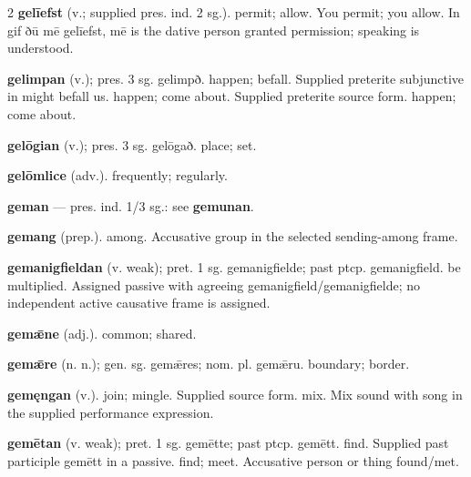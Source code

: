 \begin{multicols*}{2}
\textbf{gelīefst} (v.; supplied pres. ind. 2 sg.). permit; allow. You permit; you allow. In gif ðū mē gelīefst, mē is the dative person granted permission; speaking is understood.\par
\textbf{gelimpan} (v.); pres. 3 sg. gelimpð. happen; befall. Supplied preterite subjunctive in might befall us. happen; come about. Supplied preterite source form. happen; come about.\par
\textbf{gelōgian} (v.); pres. 3 sg. gelōgað. place; set.\par
\textbf{gelōmlice} (adv.). frequently; regularly.\par
\textbf{geman} — pres. ind. 1/3 sg.: see \textbf{gemunan}.\par
\textbf{gemang} (prep.). among. Accusative group in the selected sending-among frame.\par
\textbf{gemanigfieldan} (v. weak); pret. 1 sg. gemanigfielde; past ptcp. gemanigfield. be multiplied. Assigned passive with agreeing gemanigfield/gemanigfielde; no independent active causative frame is assigned.\par
\textbf{gemǣne} (adj.). common; shared.\par
\textbf{gemǣre} (n. n.); gen. sg. gemǣres; nom. pl. gemǣru. boundary; border.\par
\textbf{gemęngan} (v.). join; mingle. Supplied source form. mix. Mix sound with song in the supplied performance expression.\par
\textbf{gemētan} (v. weak); pret. 1 sg. gemētte; past ptcp. gemētt. find. Supplied past participle gemētt in a passive. find; meet. Accusative person or thing found/met.\par

\end{multicols*}
